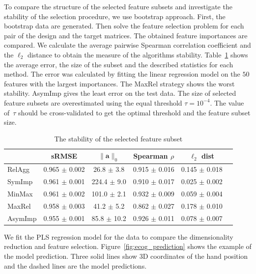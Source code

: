 \documentclass[12pt,twoside]{article}
\theoremstyle{definition}
\newcommand{\ba}{\mathbf{a}}
\begin{document}
To compare the structure of the selected feature subsets and investigate the stability of the selection procedure, we use bootstrap approach. 
First, the bootstrap data are generated. 
Then solve the feature selection problem for each pair of the design and the target matrices.
The obtained feature importances are compared. 
We calculate the average pairwise Spearman correlation coefficient and the $\ell_2$ distance to obtain the measure of the algorithms stability.
Table~\ref{tbl:stability} shows the average error, the size of the subset and the described statistics for each method. The error was calculated by fitting the linear regression model on the $50$ features with the largest importances.
The MaxRel strategy shows the worst stability.
AsymImp gives the least error on the test data. 
The size of selected feature subsets are overestimated using the equal threshold $\tau=10^{-4}$. 
The value of~$\tau$ should be cross-validated to get the optimal threshold and the feature subset size. 

\begin{table}[]
	\caption{The stability of the selected feature subset}
	\centering
	\begin{tabular}{l|ccccc}
		\hline
		& sRMSE  & $\|\ba\|_0$ & Spearman $\rho$ & $\ell_2$ dist \\ \hline
		RelAgg & 0.965 $\pm$ 0.002 & 26.8 $\pm$ 3.8 & 0.915 $\pm$ 0.016 & 0.145 $\pm$ 0.018   \\
		SymImp & 0.961 $\pm$ 0.001 & 224.4 $\pm$ 9.0 & 0.910 $\pm$ 0.017 & 0.025 $\pm$ 0.002   \\
		MinMax & 0.961 $\pm$ 0.002 & 101.0 $\pm$ 2.1& 0.932 $\pm$ 0.009 & 0.059 $\pm$ 0.004   \\
		MaxRel & 0.958 $\pm$ 0.003 & 41.2 $\pm$ 5.2 & 0.862 $\pm$ 0.027 & 0.178 $\pm$ 0.010   \\
		AsymImp & 0.955 $\pm$ 0.001 & 85.8 $\pm$ 10.2& 0.926 $\pm$ 0.011 & 0.078 $\pm$ 0.007  \\ \hline
	\end{tabular}
	\label{tbl:stability}
\end{table}

We fit the PLS regression model for the data to compare the dimensionality reduction and feature selection. 
Figure~\ref{fig:ecog_prediction} shows the example of the model prediction. Three solid lines show 3D coordinates of the hand position and the dashed lines are the model predictions.
\end{document}
